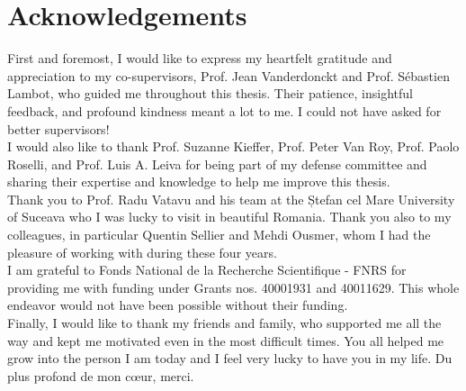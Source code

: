 \chapter*{Acknowledgements}

First and foremost, I would like to express my heartfelt gratitude and appreciation to my co-supervisors, Prof. Jean Vanderdonckt and Prof. S\'ebastien Lambot, who guided me throughout this thesis. Their patience, insightful feedback, and profound kindness meant a lot to me. I could not have asked for better supervisors!
\\

I would also like to thank Prof. Suzanne Kieffer, Prof. Peter Van Roy, Prof. Paolo Roselli, and Prof. Luis A. Leiva for being part of my defense committee and sharing their expertise and knowledge to help me improve this thesis.
\\

Thank you to Prof. Radu Vatavu and his team at the Ștefan cel Mare University of Suceava who I was lucky to visit in beautiful Romania.
Thank you also to my colleagues, in particular Quentin Sellier and Mehdi Ousmer, whom I had the pleasure of working with during these four years.
\\

I am grateful to Fonds National de la Recherche Scientifique - FNRS for providing me with funding under Grants nos. 40001931 and 40011629. This whole endeavor would not have been possible without their funding.
\\

Finally, I would like to thank my friends and family, who supported me all the way and kept me motivated even in the most difficult times. You all helped me grow into the person I am today and I feel very lucky to have you in my life. Du plus profond de mon c\oe{}ur, merci.